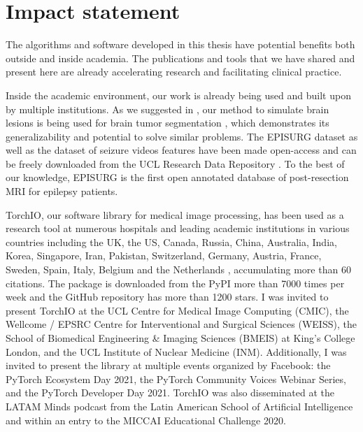 \chapter{Impact statement}

The algorithms and software developed in this thesis have potential benefits both outside and inside academia.
The publications and tools that we have shared and present here are already accelerating research and facilitating clinical practice.

Inside the academic environment, our work is already being used and built upon by multiple institutions.
As we suggested in \cite{perez-garcia_self-supervised_2021}, our method to simulate brain lesions is being used for brain tumor segmentation \cite{zhang_self-supervised_2021}, which demonstrates its generalizability and potential to solve similar problems.
The EPISURG dataset as well as the dataset of seizure videos features have been made open-access and can be freely downloaded from the UCL Research Data Repository \cite{perez-garcia_episurg_2020,perez-garcia_data_2021}.
To the best of our knowledge, EPISURG is the first open annotated database of post-resection \ac{MRI} for epilepsy patients.

TorchIO, our software library for medical image processing, has been used as a research tool at numerous hospitals and leading academic institutions in various countries including the UK, the US, Canada, Russia, China, Australia, India, Korea, Singapore, Iran, Pakistan, Switzerland, Germany, Austria, France, Sweden, Spain, Italy, Belgium and the Netherlands%
, accumulating more than 60 citations.
The package is downloaded from the \ac{PyPI} more than 7000 times per week and the GitHub repository has more than 1200 stars.
I was invited to present TorchIO at the UCL Centre for Medical Image Computing (CMIC), the Wellcome / EPSRC Centre for Interventional and Surgical Sciences (WEISS), the School of Biomedical Engineering \& Imaging Sciences (BMEIS) at King's College London, and the UCL Institute of Nuclear Medicine (INM).
Additionally, I was invited to present the library at multiple events organized by Facebook: the PyTorch Ecosystem Day 2021, the PyTorch Community Voices Webinar Series, and the PyTorch Developer Day 2021.
TorchIO was also disseminated at the LATAM Minds podcast from the Latin American School of Artificial Intelligence and within an entry to the MICCAI Educational Challenge 2020.

